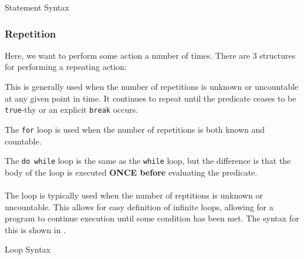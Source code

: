 \begin{listing}[h!tbp]
\caption{\texorpdfstring{}{\texttt{switch case}} Statement Syntax}
\label{lst:switch_case_Statement}
\end{listing}

\subsubsection{Repetition}\label{subsubsec:Repetition}
Here, we want to perform some action a number of times.
There are 3 structures for performing a repeating action:
\begin{description}[noitemsep]
\item[\nameref{par:while_Loop} Loop] This is generally used when the number of repetitions is unknown or uncountable at any given point in time.
  It continues to repeat until the predicate ceases to be \texttt{true}-thy or an explicit \texttt{break} occurs.

\item[\nameref{par:for_Loop} Loop] The \texttt{for} loop is used when the number of repetitions is both known and countable.

\item[\nameref{par:dowhile_Loop} Loop] The \texttt{do while} loop is the same as the \texttt{while} loop, but the difference is that the body of the loop is executed \textbf{ONCE before} evaluating the predicate.
\end{description}

\paragraph{\texorpdfstring{}{\texttt{while}}}\label{par:while_Loop}
The  loop is typically used when the number of reptitions is unknown or uncountable.
This allows for easy definition of infinite loops, allowing for a program to continue execution until some condition has been met.
The syntax for this is shown in .

\begin{listing}[h!tbp]
\caption{\texorpdfstring{}{\texttt{while}} Loop Syntax}
\label{lst:while_Loop}
\end{listing}


